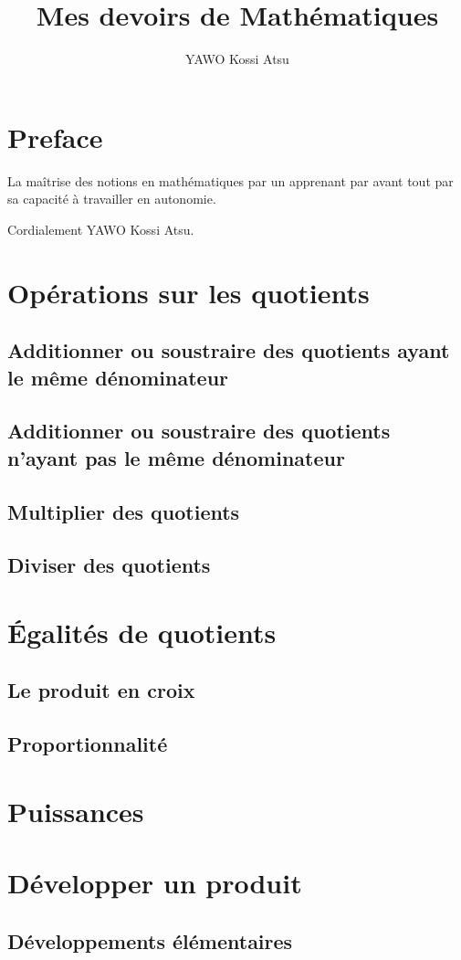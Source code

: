 \documentclass[12pt,a4paper]{report}
\author{YAWO Kossi Atsu}
\title{Mes devoirs de Mathématiques}
\begin{document}
\dominitoc

\tableofcontents
\chapter*{Preface}
La maîtrise des notions en mathématiques par un apprenant par avant tout par sa capacité à travailler en autonomie.

\vspace{1cm}
Cordialement YAWO Kossi Atsu.
\chapter{Opérations sur les quotients}
\section{Additionner ou soustraire des quotients ayant le même dénominateur}
\section{Additionner ou soustraire des quotients n'ayant pas le même dénominateur}
\section{Multiplier des quotients}
\section{Diviser des quotients}

\chapter{Égalités de quotients}
\section{Le produit en croix}
\section{Proportionnalité}

\chapter{Puissances}
\chapter{Développer un produit}
\section{Développements élémentaires}
\end{document}
